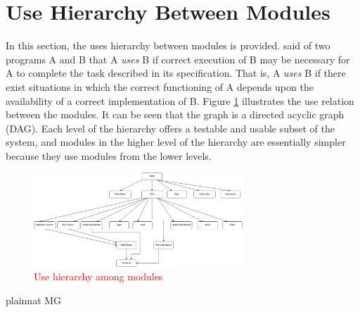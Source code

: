\documentclass[12pt, titlepage]{article}
\begin{document}
	\section{Use Hierarchy Between Modules} \label{SecUse}
	
	In this section, the uses hierarchy between modules is
	provided. \citet{Parnas1978} said of two programs A and B that A {\em uses} B if
	correct execution of B may be necessary for A to complete the task described in
	its specification. That is, A {\em uses} B if there exist situations in which
	the correct functioning of A depends upon the availability of a correct
	implementation of B.  Figure \ref{FigUH} illustrates the use relation between
	the modules. It can be seen that the graph is a directed acyclic graph
	(DAG). Each level of the hierarchy offers a testable and usable subset of the
	system, and modules in the higher level of the hierarchy are essentially simpler
	because they use modules from the lower levels.
	
	\begin{figure}[H]
		\centering
		\includegraphics[width=0.7\textwidth]{useHierarchy.png}
		\caption{\textcolor{red}{Use hierarchy among modules}}
		\label{FigUH}
	\end{figure}
	
	
	 {plainnat}
	 {MG}
	
\end{document}
